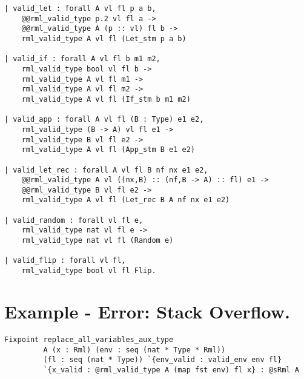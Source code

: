 \documentclass[11pt, leqno, titlepage]{article}
\theoremstyle{definition}
\begin{document}
\begin{appendices}
\begin{lstlisting}[language=coq]
| valid_let : forall A vl fl p a b,
    @@rml_valid_type p.2 vl fl a ->
    @@rml_valid_type A (p :: vl) fl b ->
    rml_valid_type A vl fl (Let_stm p a b)
                   
| valid_if : forall A vl fl b m1 m2,
    rml_valid_type bool vl fl b ->
    rml_valid_type A vl fl m1 ->
    rml_valid_type A vl fl m2 ->
    rml_valid_type A vl fl (If_stm b m1 m2)
                   
| valid_app : forall A vl fl (B : Type) e1 e2,
    rml_valid_type (B -> A) vl fl e1 ->
    rml_valid_type B vl fl e2 ->
    rml_valid_type A vl fl (App_stm B e1 e2)

| valid_let_rec : forall A vl fl B nf nx e1 e2,
    @@rml_valid_type A vl ((nx,B) :: (nf,B -> A) :: fl) e1 ->
    @@rml_valid_type B vl fl e2 ->
    rml_valid_type A vl fl (Let_rec B A nf nx e1 e2)

| valid_random : forall vl fl e,
    rml_valid_type nat vl fl e ->
    rml_valid_type nat vl fl (Random e)

| valid_flip : forall vl fl,
    rml_valid_type bool vl fl Flip.
\end{lstlisting}
  \newpage

  \section{Example - Error: Stack Overflow.}
\begin{lstlisting}[language=coq]
Fixpoint replace_all_variables_aux_type
         A (x : Rml) (env : seq (nat * Type * Rml))
         (fl : seq (nat * Type)) `{env_valid : valid_env env fl}
         `{x_valid : @rml_valid_type A (map fst env) fl x} : @sRml A
                                                                            

\end{lstlisting}
\end{appendices}
\end{document}
